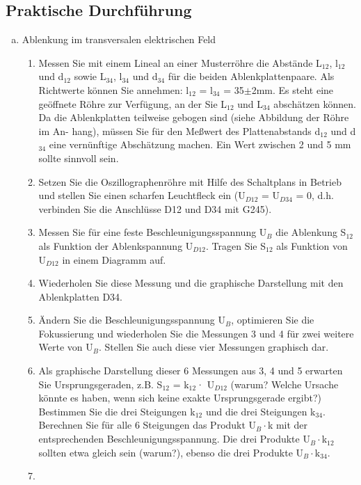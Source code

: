 \documentclass[12pt]{scrartcl}
\begin{document}
\subsection{Praktische Durchführung}
\begin{enumerate}[(a)]
\item Ablenkung im transversalen elektrischen Feld
\newline
\begin{enumerate}
\item
Messen Sie mit einem Lineal an einer Musterröhre die Abstände
L$_{12}$, l$_{12}$ und d$_{12}$
sowie L$_{34}$, l$_{34}$ und d$_{34}$ für die beiden Ablenkplattenpaare. Als Richtwerte können Sie annehmen:
l$_{12}$ = l$_{34}$ = 35$\pm$2mm. Es steht eine geöffnete Röhre zur Verfügung,
an der Sie L$_{12}$ und L$_{34}$ abschätzen können.
Da die Ablenkplatten teilweise gebogen sind (siehe Abbildung der Röhre im An-
hang), müssen Sie für den Meßwert des Plattenabstands
d$_{12}$ und d$_{34}$ eine vernünftige Abschätzung machen. Ein Wert zwischen 2 und 5 mm sollte sinnvoll sein.
\item
Setzen Sie die Oszillographenröhre mit Hilfe des Schaltplans in %
Betrieb und stellen Sie einen scharfen Leuchtfleck ein (U$_{D12}$ = U$_{D34}$ = 0, d.h. verbinden Sie die Anschlüsse D12 und D34 mit G245).
\item
Messen Sie für eine feste Beschleunigungsspannung U$_{B}$
die Ablenkung S$_{12}$ als
Funktion der Ablenkspannung U$_{D12}$. Tragen Sie S$_{12}$
als Funktion von U$_{D12}$ in einem Diagramm auf.
\item
Wiederholen Sie diese Messung und die graphische Darstellung mit den Ablenkplatten D34.
\item
Ändern Sie die Beschleunigungsspannung U$_B$, optimieren Sie die Fokussierung
und wiederholen Sie die Messungen 3 und 4 für zwei weitere Werte von U$_B$. Stellen Sie auch diese vier Messungen graphisch dar.
\item
Als graphische Darstellung dieser 6 Messungen aus
3, 4 und 5 erwarten Sie Ursprungsgeraden, z.B. S$_{12}$ = k$_{12}$· U$_{D12}$ (warum? Welche Ursache könnte es
haben, wenn sich keine exakte Ursprungsgerade ergibt?)
Bestimmen Sie die drei Steigungen k$_{12}$ und die drei Steigungen k$_{34}$.
Berechnen Sie für alle 6 Steigungen das Produkt U$_B\cdot$k
mit der entsprechenden
Beschleunigungsspannung. Die drei Produkte U$_B\cdot$k$_{12}$
sollten etwa gleich sein
(warum?), ebenso die drei Produkte U$_B\cdot$k$_{34}$.
\item

\end{enumerate}
\end{enumerate}
\end{document}
